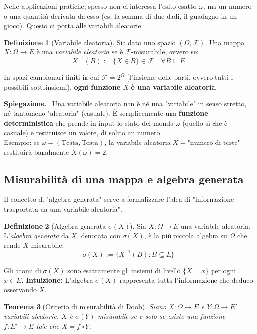 \documentclass[11pt, a4paper]{report}
\theoremstyle{plain}
\newtheorem{theorem}{Teorema}[chapter]
\theoremstyle{definition}
\newtheorem{definition}[theorem]{Definizione}
\theoremstyle{remark}
\newenvironment{spiegazione}[1][Spiegazione]
{\begin{mdframed}[backgroundcolor=green!5, linecolor=green!50, linewidth=2pt, topline=false, rightline=false, bottomline=false]
\textbf{\textsf{#1.}}\ }
{\end{mdframed}}
\newcommand{\F}{\mathcal{F}}
\newcommand{\1}{\mathbf{1}}
\begin{document}
Nelle applicazioni pratiche, spesso non ci interessa l'esito esatto $\omega$, ma un numero o una quantità derivata da esso (es. la somma di due dadi, il guadagno in un gioco). Questo ci porta alle variabili aleatorie.

\begin{definition}[Variabile aleatoria]
Sia dato uno spazio $(\Omega, \F)$. Una mappa $X : \Omega \to E$ è una \emph{variabile aleatoria} se è $\F$-misurabile, ovvero se:
\[ X^{-1}(B) := \{X \in B\} \in \F \quad \forall B \subseteq E \]
\end{definition}

In spazi campionari finiti in cui $\F = 2^\Omega$ (l'insieme delle parti, ovvero tutti i possibili sottoinsiemi), \textbf{ogni funzione $X$ è una variabile aleatoria}.

\begin{spiegazione}
    Una variabile aleatoria non è né una "variabile" in senso stretto, né tantomeno "aleatoria" (casuale). È semplicemente una \textbf{funzione deterministica} che prende in input lo stato del mondo $\omega$ (quello sì che è casuale) e restituisce un valore, di solito un numero. \\
    Esempio: se $\omega = (\text{Testa}, \text{Testa})$, la variabile aleatoria $X = \text{"numero di teste"}$ restituirà banalmente $X(\omega) = 2$.
\end{spiegazione}

\subsection{Misurabilità di una mappa e algebra generata}

Il concetto di "algebra generata" serve a formalizzare l'idea di "informazione trasportata da una variabile aleatoria".

\begin{definition}[Algebra generata $\sigma(X)$]
Sia $X : \Omega \to E$ una variabile aleatoria. L'\emph{algebra generata} da $X$, denotata con $\sigma(X)$, è la più piccola algebra su $\Omega$ che rende $X$ misurabile:
\[ \sigma(X) := \{ X^{-1}(B) : B \subseteq E \} \]
\end{definition}

Gli atomi di $\sigma(X)$ sono esattamente gli insiemi di livello $\{X = x\}$ per ogni $x \in E$. 
\textbf{Intuizione:} L'algebra $\sigma(X)$ rappresenta tutta l'informazione che deduco osservando $X$.

\begin{theorem}[Criterio di misurabilità di Doob]
Siano $X : \Omega \to E$ e $Y : \Omega \to E'$ variabili aleatorie. 
$X$ è $\sigma(Y)$-misurabile se e solo se esiste una funzione $f : E' \to E$ tale che $X = f \circ Y$.
\end{theorem}
\end{document}

